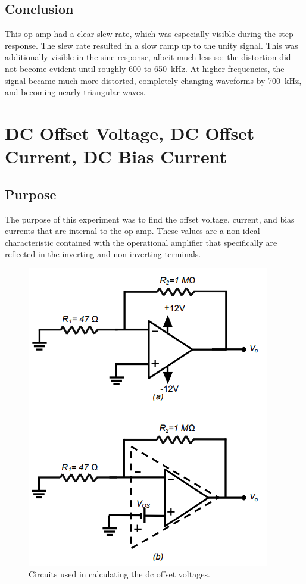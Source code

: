 \documentclass{report}
\begin{document}
\subsection{Conclusion}
This op amp had a clear slew rate, which was especially visible during the step response. The slew rate resulted in a slow ramp up to the unity signal. This was additionally visible in the sine response, albeit much less so: the distortion did not become evident until roughly \num{600} to \SI{650}{\kHz}. At higher frequencies, the signal became much more distorted, completely changing waveforms by \SI{700}{\kHz}, and becoming nearly triangular waves.

\section{DC Offset Voltage, DC Offset Current, DC Bias Current}

\subsection{Purpose}
The purpose of this experiment was to find the offset voltage, current, and bias currents that are internal to the op amp. These values are a non-ideal characteristic contained with the operational amplifier that specifically are reflected in the inverting and non-inverting terminals.

\begin{figure}[h]
	\centering
	\includegraphics[width=0.5\linewidth]{exp3a}
	\caption{Circuits used in calculating the dc offset voltages.}
	\label{fig:exp3a}
\end{figure}
\end{document}

